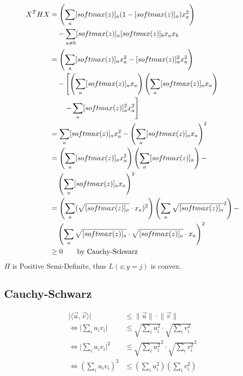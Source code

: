 \documentclass{article}
\begin{document}
\begin{equation}
	\begin{split}
		X^{T}HX &= \left( \sum_{a}[softmax(z)]_{a}
					(1-[softmax(z)]_{a})x_{a}^{2}\right) \\
					&\quad -\sum_{a \neq b}
						[softmax(z)]_{a}[softmax(z)]_{b}x_{a}x_{b} \\
				&= \left( \sum_{a}[softmax(z)]_{a}x_{a}^{2}
					- [softmax(z)]_{a}^{2}x_{a}^{2}\right) \\
					&\quad-\left[
						\left( 
							\sum_{a}[softmax(z)]_{a}x_{a}
						\right)
						\left(
							\sum_{a}[softmax(z)]_{a}x_{a}
						\right) \right.\\
						&\left. \qquad - \sum_{a}
									[softmax(z)]_{a}^{2}x_{a}^{2}
								\vphantom{\left(\sum\right)}
						 \right] \\
				&= \sum_{a}[softmax(z)]_{a}x_{a}^2 -
					\left( \sum_{a}[softmax(z)]_{a}x_{a}\right)^2 \\
				&= \left(\sum_{a}[softmax(z)]_{a}x_{a}^2\right)
					\left(\sum_{a}[softmax(z)]_{a}\right) - \\
					&\quad \left( \sum_{a}
						[softmax(z)]_{a}x_{a}\right)^2 \\
				&= \left(\sum_{a}(\sqrt{[softmax(z)]_{a}}\cdot x_{a})^2\right)
					\left(\sum_{a}\sqrt{[softmax(z)]_{a}}^2\right) - \\
					&\quad \left( \sum_{a}
						\sqrt{[softmax(z)]_{a}}\cdot
						\sqrt{[softmax(z)]_{a}}\cdot x_{a}\right)^2 \\
				&\geq 0 \qquad \text{by Cauchy-Schwarz}
	\end{split}
\end{equation}
$H$ is Positive Semi-Definite, thus $L(z;y=j)$ is convex.
\subsection*{Cauchy-Schwarz}
\begin{equation}
	\begin{split}
		\lvert \langle \vec{u},\vec{v} \rangle \rvert &\leq
		\lVert \vec{u} \rVert \cdot \lVert \vec{v} \rVert \\
		\Leftrightarrow \bigg\lvert 
						\sum_i u_i v_i \bigg\rvert &\leq
			\sqrt{\sum_i u_i^2} \cdot
				\sqrt{\sum_i v_i^2} \\
		\Leftrightarrow \bigg\lvert
				\sum_i u_i v_i \bigg\rvert^2 &\leq
			\sqrt{\sum_i u_i^2}^2 \cdot
				\sqrt{\sum_i v_i^2}^2 \\
		\Leftrightarrow \left(
				\sum_i u_i v_i \right)^2 &\leq
			\left( \sum_i u_i^2 \right)
				\left( \sum_i v_i^2 \right)
	\end{split}
\end{equation}
\end{document}

